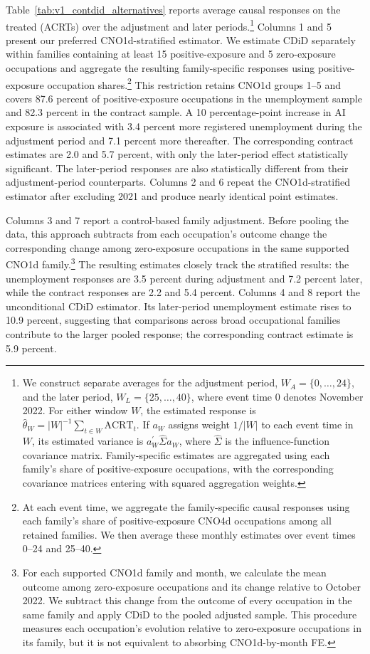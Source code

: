 \documentclass[11pt]{article}
\begin{document}
Table~\ref{tab:v1_contdid_alternatives} reports average causal responses on the treated (ACRTs) over the adjustment and later periods.\footnote{We construct separate averages for the adjustment period, \(W_A=\{0,\ldots,24\}\), and the later period, \(W_L=\{25,\ldots,40\}\), where event time 0 denotes November 2022. For either window \(W\), the estimated response is \(\widehat{\theta}_{W}=|W|^{-1}\sum_{t\in W}\widehat{\mathrm{ACRT}}_{t}\). If \(a_W\) assigns weight \(1/|W|\) to each event time in \(W\), its estimated variance is \(a_W^{\prime}\widehat{\Sigma}a_W\), where \(\widehat{\Sigma}\) is the influence-function covariance matrix. Family-specific estimates are aggregated using each family's share of positive-exposure occupations, with the corresponding covariance matrices entering with squared aggregation weights.} Columns 1 and 5 present our preferred CNO1d-stratified estimator. We estimate CDiD separately within families containing at least 15 positive-exposure and 5 zero-exposure occupations and aggregate the resulting family-specific responses using positive-exposure occupation shares.\footnote{At each event time, we aggregate the family-specific causal responses using each family's share of positive-exposure CNO4d occupations among all retained families. We then average these monthly estimates over event times 0--24 and 25--40.} This restriction retains CNO1d groups 1--5 and covers 87.6 percent of positive-exposure occupations in the unemployment sample and 82.3 percent in the contract sample. A 10 percentage-point increase in AI exposure is associated with 3.4 percent more registered unemployment during the adjustment period and 7.1 percent more thereafter. The corresponding contract estimates are 2.0 and 5.7 percent, with only the later-period effect statistically significant. The later-period responses are also statistically different from their adjustment-period counterparts. Columns 2 and 6 repeat the CNO1d-stratified estimator after excluding 2021 and produce nearly identical point estimates.

Columns 3 and 7 report a control-based family adjustment. Before pooling the data, this approach subtracts from each occupation's outcome change the corresponding change among zero-exposure occupations in the same supported CNO1d family.\footnote{For each supported CNO1d family and month, we calculate the mean outcome among zero-exposure occupations and its change relative to October 2022. We subtract this change from the outcome of every occupation in the same family and apply CDiD to the pooled adjusted sample. This procedure measures each occupation's evolution relative to zero-exposure occupations in its family, but it is not equivalent to absorbing CNO1d-by-month FE.} The resulting estimates closely track the stratified results: the unemployment responses are 3.5 percent during adjustment and 7.2 percent later, while the contract responses are 2.2 and 5.4 percent. Columns 4 and 8 report the unconditional CDiD estimator. Its later-period unemployment estimate rises to 10.9 percent, suggesting that comparisons across broad occupational families contribute to the larger pooled response; the corresponding contract estimate is 5.9 percent.
\end{document}
